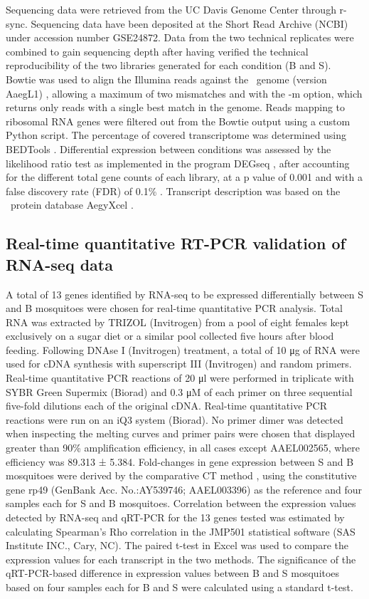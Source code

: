 Sequencing data were retrieved from the UC Davis Genome Center through r-sync. Sequencing data have been deposited at the Short Read Archive (NCBI) under accession number GSE24872. Data from the two technical replicates were combined to gain sequencing depth after having verified the technical reproducibility of the two libraries generated for each condition (B and S). Bowtie \cite{Langmead2009} was used to align the Illumina reads against the \Aa\ genome (version AaegL1) \cite{Lawson2009}, allowing a maximum of two mismatches and with the -m option, which returns only reads with a single best match in the genome. Reads mapping to ribosomal RNA genes were filtered out from the Bowtie output using a custom Python script. The percentage of covered transcriptome was determined using BEDTools \cite{Quinlan2010}. Differential expression between conditions was assessed by the likelihood ratio test as implemented in the program DEGseq \cite{Wang2010}, after accounting for the different total gene counts of each library, at a p value of 0.001 and with a false discovery rate (FDR) of 0.1\% \cite{Benjamini1995}. Transcript description was based on the \Aa\ protein database AegyXcel \cite{Ribeiro-AegyXcel}.

\subsection{Real-time quantitative RT-PCR validation of RNA-seq data}

A total of 13 genes identified by RNA-seq to be expressed differentially between S and B mosquitoes were chosen for real-time quantitative PCR analysis. Total RNA was extracted by TRIZOL (Invitrogen) from a pool of eight females kept exclusively on a sugar diet or a similar pool collected five hours after blood feeding. Following DNAse I (Invitrogen) treatment, a total of 10 μg of RNA were used for cDNA synthesis with superscript III (Invitrogen) and random primers. Real-time quantitative PCR reactions of 20 μl were performed in triplicate with SYBR Green Supermix (Biorad) and 0.3 μM of each primer on three sequential five-fold dilutions each of the original cDNA. Real-time quantitative PCR reactions were run on an iQ3 system (Biorad). No primer dimer was detected when inspecting the melting curves and primer pairs were chosen that displayed greater than 90\% amplification efficiency, in all cases except AAEL002565, where efficiency was 89.313 ± 5.384. Fold-changes in gene expression between S and B mosquitoes were derived by the comparative CT method \cite{Schmittgen2008}, using the constitutive gene rp49 (GenBank Acc. No.:AY539746; AAEL003396) as the reference and four samples each for S and B mosquitoes. Correlation between the expression values detected by RNA-seq and qRT-PCR for the 13 genes tested was estimated by calculating Spearman's Rho correlation in the JMP501 statistical software (SAS Institute INC., Cary, NC). The paired t-test in Excel was used to compare the expression values for each transcript in the two methods. The significance of the qRT-PCR-based difference in expression values between B and S mosquitoes based on four samples each for B and S were calculated using a standard t-test.

